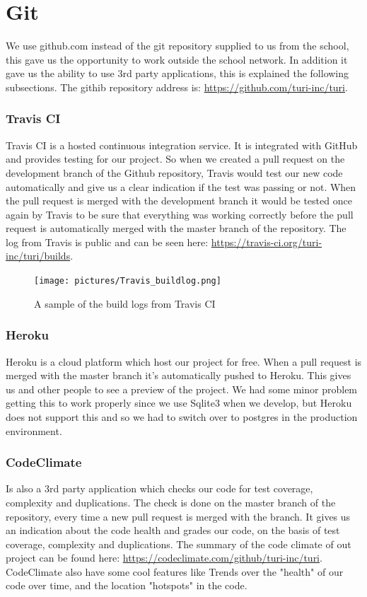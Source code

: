 \documentclass[a4paper]{article}
\begin{document}
\section{Git}
We use github.com instead of the git repository supplied to us from the school, this gave us the opportunity to work outside the school network. In addition it gave us the ability to use 3rd party applications, this is explained the following subsections. The githib repository address is: \url{https://github.com/turi-inc/turi}.

\subsubsection{Travis CI}
Travis CI is a hosted continuous integration service. It is integrated with GitHub and provides testing for our project. So when we created a pull request on the development branch of the Github repository, Travis would test our new code automatically and give us a clear indication if the test was passing or not. When the pull request is merged with the development branch it would be tested once again by Travis to be sure that everything was working correctly before the pull request is automatically merged with the master branch of the repository. The log from Travis is public and can be seen here: \url{https://travis-ci.org/turi-inc/turi/builds}.

\begin{figure}
  \begin{center}
    \texttt{[image: pictures/Travis\_buildlog.png]}
    \caption{A sample of the build logs from Travis CI}
    \label{fig:travis_log}
  \end{center}
\end{figure}


\subsubsection{Heroku}
Heroku is a cloud platform which host our project for free. When a pull request is merged with the master branch it's automatically pushed to Heroku. This gives us and other people to see a preview of the project. We had some minor problem getting this to work properly since we use Sqlite3 when we develop, but Heroku does not support this and so we had to switch over to postgres in the production environment.

\subsubsection{CodeClimate}
Is also a 3rd party application which checks our code for test coverage, complexity and duplications. The check is done on the master branch of the repository, every time a new pull request is merged with the branch. It gives us an indication about the code health and grades our code, on the basis of test coverage, complexity and duplications. The summary of the code climate of out project can be found here: \url{https://codeclimate.com/github/turi-inc/turi}. \\
CodeClimate also have some cool features like Trends over the "health" of our code over time, and the location "hotspots" in the code.  
\end{document}

